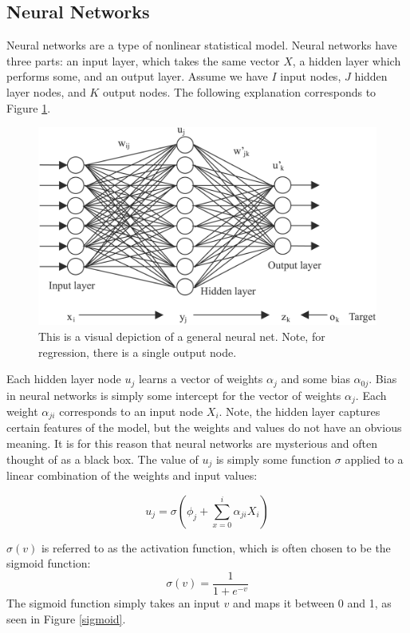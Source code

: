\documentclass[12pt]{article}
\begin{document}
\subsection{Neural Networks}
Neural networks are a type of nonlinear statistical model. Neural networks have three parts: an input layer, which takes the same vector $X$, a hidden layer which performs some, and an output layer. Assume we have $I$ input nodes, $J$ hidden layer nodes, and $K$ output nodes. The following explanation corresponds to Figure \ref{neuralnet}. 

\begin{figure}[ht]
	\centering
	\includegraphics[width=.85\textwidth]{NeuralNetwork.png}
	\caption{This is a visual depiction of a general neural net. Note, for regression, there is a single output node. \cite{neural}}
	\label{neuralnet}
\end{figure}

Each hidden layer node $u_j$ learns a vector of weights $\alpha_j$ and some bias $\alpha_{0j}$. Bias in neural networks is simply some intercept for the vector of weights $\alpha_j$. Each weight $\alpha_{ji}$ corresponds to an input node $X_i$. Note, the hidden layer captures certain features of the model, but the weights and values do not have an obvious meaning. It is for this reason that neural networks are mysterious and often thought of as a black box. The value of $u_j$ is simply some function $\sigma$ applied to a linear combination of the weights and input values:

$$u_j = \sigma(\phi_{j} + \sum_{x=0}^{i}\alpha_{ji} X_i)$$

$\sigma(v)$ is referred to as the activation function, which is often chosen to be the sigmoid function:
$$\sigma(v) = \frac{1}{1+e^{-v}}$$
The sigmoid function simply takes an input $v$ and maps it between 0 and 1, as seen in Figure \ref{sigmoid}. 
\end{document}
